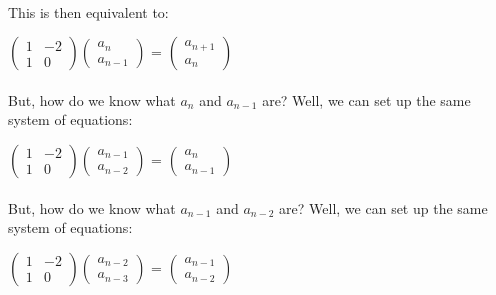 \documentclass{article}
\begin{document}
        \paragraph{}
            This is then equivalent to:
            \begin{center}
            	\(\begin{pmatrix}1 & -2\\1 & 0\end{pmatrix}\)\(\begin{pmatrix}a_{n}\\a_{n-1}\end{pmatrix}\) = 
                	\(\begin{pmatrix}a_{n+1}\\a_{n}\end{pmatrix}\)
            \end{center}
        \paragraph{}
        	But, how do we know what $a_{n}$ and $a_{n-1}$ are? Well, we can set up the same system of equations:
            \begin{center}
            	\(\begin{pmatrix}1 & -2\\1 & 0\end{pmatrix}\)\(\begin{pmatrix}a_{n-1}\\a_{n-2}\end{pmatrix}\) = 
                	\(\begin{pmatrix}a_{n}\\a_{n-1}\end{pmatrix}\)
            \end{center}
        \paragraph{}
        	But, how do we know what $a_{n-1}$ and $a_{n-2}$ are? Well, we can set up the same system of equations:
            \begin{center}
            	\(\begin{pmatrix}1 & -2\\1 & 0\end{pmatrix}\)\(\begin{pmatrix}a_{n-2}\\a_{n-3}\end{pmatrix}\) = 
                	\(\begin{pmatrix}a_{n-1}\\a_{n-2}\end{pmatrix}\)
            \end{center}
\end{document}
